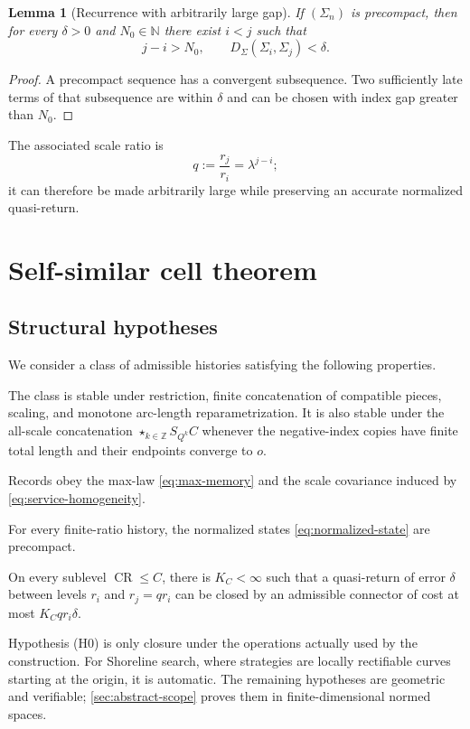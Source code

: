 \documentclass[10pt,a4paper]{article}
\newtheorem{lemma}[lemma]{Lemma}
\theoremstyle{definition}
\theoremstyle{remark}
\DeclareMathOperator{\CR}{CR}
\begin{document}
\begin{lemma}[Recurrence with arbitrarily large gap]
\label{lem:large-gap-return}
If $(\Sigma_n)$ is precompact, then for every $\delta>0$ and $N_0\in\mathbb{N}$ there exist $i<j$ such that
\[
j-i>N_0,
\qquad
D_\Sigma(\Sigma_i,\Sigma_j)<\delta.
\]
\end{lemma}

\begin{proof}
A precompact sequence has a convergent subsequence. Two sufficiently late terms of that subsequence are within $\delta$ and can be chosen with index gap greater than $N_0$.
\end{proof}

The associated scale ratio is
\begin{equation}
q:=\frac{r_j}{r_i}=\lambda^{j-i};
\label{eq:q-ratio}
\end{equation}
it can therefore be made arbitrarily large while preserving an accurate normalized quasi-return.

\section{Self-similar cell theorem}
\subsection{Structural hypotheses}
We consider a class of admissible histories satisfying the following properties.

\begin{description}[leftmargin=3.6em,labelwidth=3em]
\item[(H0)] The class is stable under restriction, finite concatenation of compatible pieces, scaling, and monotone arc-length reparametrization. It is also stable under the all-scale concatenation $\star_{k\in\mathbb Z}S_{Q^k}C$ whenever the negative-index copies have finite total length and their endpoints converge to $o$.
\item[(H1)] Records obey the max-law \eqref{eq:max-memory} and the scale covariance induced by \eqref{eq:service-homogeneity}.
\item[(H2)] For every finite-ratio history, the normalized states \eqref{eq:normalized-state} are precompact.
\item[(H3)] On every sublevel $\CR\le C$, there is $K_C<\infty$ such that a quasi-return of error $\delta$ between levels $r_i$ and $r_j=qr_i$ can be closed by an admissible connector of cost at most $K_Cqr_i\delta$.
\end{description}
Hypothesis (H0) is only closure under the operations actually used by the construction. For Shoreline search, where strategies are locally rectifiable curves starting at the origin, it is automatic. The remaining hypotheses are geometric and verifiable; \cref{sec:abstract-scope} proves them in finite-dimensional normed spaces.
\end{document}
